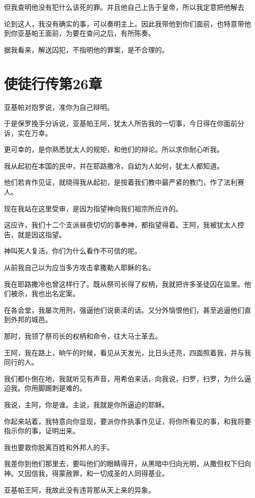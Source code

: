 \documentclass[12pt,oneside]{book}
\begin{document}
但我查明他没有犯什么该死的罪。并且他自己上告于皇帝，所以我定意把他解去

论到这人，我没有确实的事，可以奏明主上。因此我带他到你们面前，也特意带他到你亚基帕王面前，为要在查问之后，有所陈奏。

据我看来，解送囚犯，不指明他的罪案，是不合理的。

\chapter{使徒行传第26章}
亚基帕对抱罗说，准你为自己辩明。

于是保罗挽手分诉说，亚基帕王阿，犹太人所告我的一切事，今日得在你面前分诉，实在万幸。

更可幸的，是你熟悉犹太人的规矩，和他们的辩论。所以求你耐心听我。

我从起初在本国的民中，并在耶路撒冷，自幼为人如何，犹太人都知道。

他们若肯作见证，就晓得我从起初，是按着我们教中最严紧的教门，作了法利赛人。

现在我站在这里受审，是因为指望神向我们祖宗所应许的。

这应许，我们十二个支派昼夜切切的事奉神，都指望得着。王阿，我被犹太人控告，就是因这指望。

神叫死人复活，你们为什么看作不可信的呢。

从前我自己以为应当多方攻击拿撒勒人耶稣的名。

我在耶路撒冷也曾这样行了。既从祭司长得了权柄，我就把许多圣徒囚在监里。他们被杀，我也出名定案。

在各会堂，我屡次用刑，强逼他们说亵渎的话。又分外恼恨他们，甚至追逼他们直到外邦的城邑。

那时，我领了祭司长的权柄和命令，往大马士革去。

王阿，我在路上，晌午的时候，看见从天发光，比日头还亮，四面照着我，并与我同行的人。

我们都仆倒在地，我就听见有声音，用希伯来话，向我说，扫罗，扫罗，为什么逼迫我。你用脚踢刺是难的。

我说，主阿，你是谁。主说，我就是你所逼迫的耶稣。

你起来站着，我特意向你显现，要派你作执事作见证，将你所看见的事，和我将要指示你的事，证明出来。

我也要救你脱离百姓和外邦人的手。

我差你到他们那里去，要叫他们的眼睛得开，从黑暗中归向光明，从撒但权下归向神。又因信我，得蒙赦罪，和一切成圣的人同得基业。

亚基帕王阿，我故此没有违背那从天上来的异象。
\end{document}
